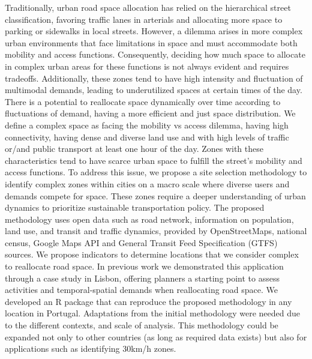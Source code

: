 \documentclass[review, 3p,
authoryear]{elsarticle} %
\begin{document}
Traditionally, urban road space allocation has relied on the
hierarchical street classification, favoring traffic lanes in arterials
and allocating more space to parking or sidewalks in local streets.
However, a dilemma arises in more complex urban environments that face
limitations in space and must accommodate both mobility and access
functions. Consequently, deciding how much space to allocate in complex
urban areas for these functions is not always evident and requires
tradeoffs. Additionally, these zones tend to have high intensity and
fluctuation of multimodal demands, leading to underutilized spaces at
certain times of the day. There is a potential to reallocate space
dynamically over time according to fluctuations of demand, having a more
efficient and just space distribution. We define a complex space as
facing the mobility vs access dilemma, having high connectivity, having
dense and diverse land use and with high levels of traffic or/and public
transport at least one hour of the day. Zones with these characteristics
tend to have scarce urban space to fulfill the street's mobility and
access functions. To address this issue, we propose a site selection
methodology to identify complex zones within cities on a macro scale
where diverse users and demands compete for space. These zones require a
deeper understanding of urban dynamics to prioritize sustainable
transportation policy. The proposed methodology uses open data such as
road network, information on population, land use, and transit and
traffic dynamics, provided by OpenStreetMaps, national census, Google
Maps API and General Transit Feed Specification (GTFS) sources. We
propose indicators to determine locations that we consider complex to
reallocate road space. In previous work we demonstrated this application
through a case study in Lisbon, offering planners a starting point to
assess activities and temporal-spatial demands when reallocating road
space. We developed an R package that can reproduce the proposed
methodology in any location in Portugal. Adaptations from the initial
methodology were needed due to the different contexts, and scale of
analysis. This methodology could be expanded not only to other countries
(as long as required data exists) but also for applications such as
identifying 30km/h zones.


\end{document}
